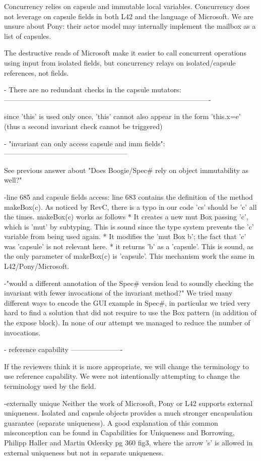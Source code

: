 Concurrency relies on capsule and immutable local variables.
Concurrency does not leverage on capsule fields in both L42 and the language of Microsoft.
We are unsure about Pony: their actor model may internally implement the mailbox as a list of capsules.

The destructive reads of Microsoft make it easier to call concurrent operations using input
from isolated fields, but concurrency relays on isolated/capsule references, not fields.

- There are no redundant checks in the capsule mutators:
----------------------------------------------------------------------------------------

 since 'this' is used only once, 'this' cannot also appear in the form 'this.x=e' (thus a second invariant check cannot be triggered)

- "invariant can only access capsule and imm fields":
-----------------------------------------------------

See previous answer about "Does Boogie/Spec# rely on object immutability as well?"

-line 685 and capsule fields access:
line 683 contains the definition of the method makeBox(c).
As noticed by RevC, there is a typo in our code 'cs' should be 'c' all the times.
makeBox(c) works as follows
* It creates a new mut Box passing 'c', which is 'mut' by subtyping.
This is sound since the type system prevents the 'c' variable from being used again.
* It modifies the 'mut Box b'; the fact that 'c' was 'capsule' is not relevant here.
* it returns 'b' as a 'capsule'.  This is sound, as the only parameter 
of makeBox(c) is 'capsule'. This mechanism work the same in L42/Pony/Microsoft.

-"would a different annotation of the Spec# version lead to soundly checking the invariant with fewer invocations of the invariant method?"
We tried many different ways to encode the GUI example in Spec#, in particular we tried very hard to find a solution that did not require to use the Box pattern (in addition of the expose block).
In none of our attempt we managed to reduce the number of invocations.

- reference capability
----------------------

If the reviewers think it is more appropriate,
we will change the terminology to use reference capability.
We were not intentionally attempting to change the terminology used by the field.

-externally unique
Neither the work of Microsoft, Pony or L42 supports external uniqueness.
Isolated and capsule objects provides a much stronger encapsulation guarantee (separate uniqueness).
A good explanation of this common misconception can be found in
Capabilities for Uniqueness and Borrowing, Philipp Haller and Martin Odersky pg 360 fig3,
where the arrow 's' is allowed in external uniqueness but not in separate uniqueness.

